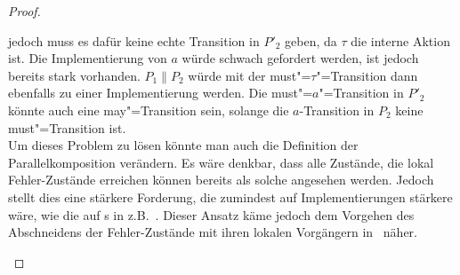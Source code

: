 \begin{proof}
\begin{enumerate}
      jedoch muss es dafür keine echte Transition in $P'_2$ geben, da $\tau$
      die interne Aktion ist. Die Implementierung von $a$ würde schwach
      gefordert werden, ist jedoch bereits stark vorhanden. $P_1\|P_2$ würde
      mit der must"=$\tau$"=Transition dann ebenfalls zu einer Implementierung
      werden. Die must"=$a$"=Transition in $P'_2$ könnte auch eine
      may"=Transition sein, solange die $a$-Transition in $P_2$ keine
      must"=Transition ist.\\
      Um dieses Problem zu lösen könnte man auch die Definition der
      Parallelkomposition verändern. Es wäre denkbar, dass alle Zustände, die
      lokal Fehler-Zustände erreichen können bereits als solche angesehen
      werden. Jedoch stellt dies eine stärkere Forderung, die zumindest auf
      Implementierungen stärkere wäre, wie die auf \EIO{}s in
      z.B.~\cite{Schinko2016BA}. Dieser Ansatz käme jedoch dem Vorgehen des
      Abschneidens der Fehler-Zustände mit ihren lokalen Vorgängern
      in~\cite{Vogler2016MIA3} näher.

    \begin{figure}[htbp]
      \begin{center}
\end{center}
\end{figure}
\end{enumerate}
\end{proof}
